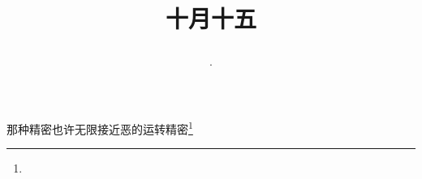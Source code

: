 \title{\date[d=15,m=11,y=2024][year:cn-y,年,month:cn,day:cn,日,·,weekday]·十月十五 }
那种精密也许无限接近恶的运转精密\footnote{ }


